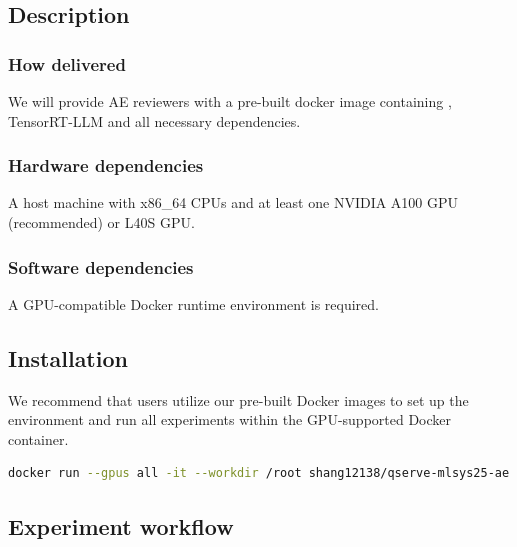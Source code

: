 {\subsection{Description}

\vspace{-3pt}
\subsubsection{How delivered}
\vspace{-3pt}

We will provide AE reviewers with a pre-built docker image containing \system, TensorRT-LLM and all necessary dependencies.

\vspace{-5pt}
\subsubsection{Hardware dependencies}
\vspace{-3pt}

A host machine with x86\_64 CPUs and at least one NVIDIA A100 GPU (recommended) or L40S GPU.

\vspace{-5pt}
\subsubsection{Software dependencies}
\vspace{-3pt}

A GPU-compatible Docker runtime environment is required.


\vspace{-5pt}
\subsection{Installation}

We recommend that users utilize our pre-built Docker images to set up the environment and run all experiments within the GPU-supported Docker container.



\begin{lstlisting}[style=mystyle, language=bash]
docker run --gpus all -it --workdir /root shang12138/qserve-mlsys25-ae
\end{lstlisting}

\vspace{-10pt}
\subsection{Experiment workflow}

}
